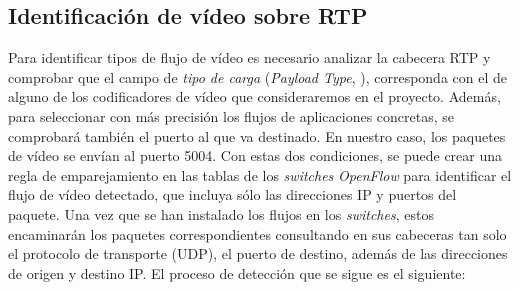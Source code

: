 \documentclass[a4paper,11pt]{book}
\begin{document}
\subsection{Identificación de vídeo sobre \ac{RTP}}

 Para identificar tipos de flujo de vídeo es necesario analizar la cabecera \ac{RTP} y comprobar que el campo de \emph{tipo de carga} (\emph{Payload Type}, \cite{rfcRTP}), corresponda con el de alguno  de los codificadores de vídeo que consideraremos en el proyecto. Además, para seleccionar con más precisión los flujos de aplicaciones concretas, se comprobará también el puerto al que va destinado. En nuestro caso, los paquetes de vídeo se envían al puerto 5004. Con estas dos condiciones, se puede crear una regla de emparejamiento en las tablas de los \emph{switches} \emph{OpenFlow} para identificar el flujo de vídeo detectado, que incluya sólo las direcciones \ac{IP} y puertos del paquete. Una vez que se han instalado los flujos en los \textit{switches}, estos encaminarán los paquetes correspondientes consultando en sus cabeceras tan solo el protocolo de transporte (\ac{UDP}), el puerto de destino, además de las direcciones de origen y destino \ac{IP}. El proceso de detección que se sigue es el siguiente:
\end{document}
